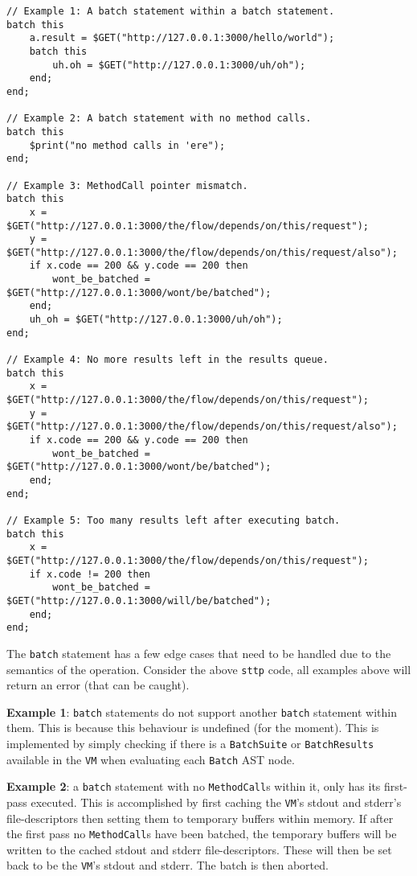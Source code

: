 \label{chap:eval-ast-nodes-batch-edge-cases}
\begin{verbatim}
// Example 1: A batch statement within a batch statement.
batch this
    a.result = $GET("http://127.0.0.1:3000/hello/world");
    batch this
        uh.oh = $GET("http://127.0.0.1:3000/uh/oh");
    end;
end;

// Example 2: A batch statement with no method calls.
batch this
    $print("no method calls in 'ere");
end;

// Example 3: MethodCall pointer mismatch.
batch this
    x = $GET("http://127.0.0.1:3000/the/flow/depends/on/this/request");
    y = $GET("http://127.0.0.1:3000/the/flow/depends/on/this/request/also");
    if x.code == 200 && y.code == 200 then
        wont_be_batched = $GET("http://127.0.0.1:3000/wont/be/batched");
    end;
    uh_oh = $GET("http://127.0.0.1:3000/uh/oh");
end;

// Example 4: No more results left in the results queue.
batch this
    x = $GET("http://127.0.0.1:3000/the/flow/depends/on/this/request");
    y = $GET("http://127.0.0.1:3000/the/flow/depends/on/this/request/also");
    if x.code == 200 && y.code == 200 then
        wont_be_batched = $GET("http://127.0.0.1:3000/wont/be/batched");
    end;
end;

// Example 5: Too many results left after executing batch.
batch this
    x = $GET("http://127.0.0.1:3000/the/flow/depends/on/this/request");
    if x.code != 200 then
        wont_be_batched = $GET("http://127.0.0.1:3000/will/be/batched");
    end;
end;
\end{verbatim}

The \verb|batch| statement has a few edge cases that need to be handled due to the semantics of the operation. Consider the above \verb|sttp| code, all examples above will return an error (that can be caught).

\textbf{Example 1}: \verb|batch| statements do not support another \verb|batch| statement within them. This is because this behaviour is undefined (for the moment). This is implemented by simply checking if there is a \verb|BatchSuite| or \verb|BatchResults| available in the \verb|VM| when evaluating each \verb|Batch| AST node.

\textbf{Example 2}: a \verb|batch| statement with no \verb|MethodCall|s within it, only has its first-pass executed. This is accomplished by first caching the \verb|VM|'s stdout and stderr's file-descriptors then setting them to temporary buffers within memory. If after the first pass no \verb|MethodCall|s have been batched, the temporary buffers will be written to the cached stdout and stderr file-descriptors. These will then be set back to be the \verb|VM|'s stdout and stderr. The batch is then aborted.

